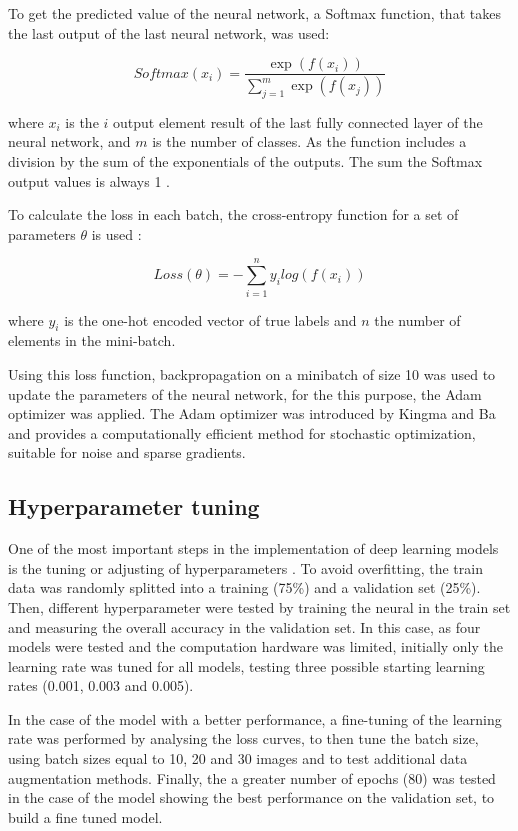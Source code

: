 \documentclass[11pt,onecolumn,titlepage,letterpaper]{article}
\begin{document}
To get the predicted value of the neural network, a Softmax function, that takes the last output of the last neural network, was used:

\begin{equation}
	{Softmax}(x_{i}) = \frac{\exp(f(x_i))}{\sum_{j=1}^{m} \exp(f(x_j))}
\end{equation}

where $x_i$ is the $i$ output element result of the last fully connected layer of the neural network, and $m$ is the number of classes. As the function includes a division by the sum of the exponentials of the outputs. The sum the Softmax output values is always 1 \cite{Skansi2018}.

To calculate the loss in each batch, the cross-entropy function for a set of parameters $\theta$ is used \cite{Hastie2009}:

\begin{equation}
	{Loss}(\theta) = - \sum_{i=1}^{n} y_i log(f(x_i))
\end{equation}

where $y_i$ is the one-hot encoded vector of true labels and $n$ the number of elements in the mini-batch. 

Using this loss function, backpropagation on a minibatch of size 10 was used to update the parameters of the neural network, for the this purpose, the Adam optimizer was applied. The Adam optimizer was introduced by Kingma and Ba \cite{Kingma2015} and provides a computationally efficient method for stochastic optimization, suitable for noise and sparse gradients.

\subsection{Hyperparameter tuning}

One of the most important steps in the implementation of deep learning models is the tuning or adjusting of hyperparameters \cite{Skansi2018}. To avoid overfitting, the train data was randomly splitted into a training (75\%) and a validation set (25\%). Then, different hyperparameter were tested by training the neural in the train set and measuring the overall accuracy in the validation set. In this case, as four models were tested and the computation hardware was limited, initially only the learning rate was tuned for all models, testing three possible starting learning rates (0.001, 0.003 and 0.005). 

In the case of the model with a better performance, a fine-tuning of the learning rate was performed by analysing the loss curves, to then tune the batch size, using batch sizes equal to 10, 20 and 30 images and to test additional data augmentation methods. Finally, the a greater number of epochs (80) was tested in the case of the model showing the best performance on the validation set, to build a fine tuned model.
\end{document}
